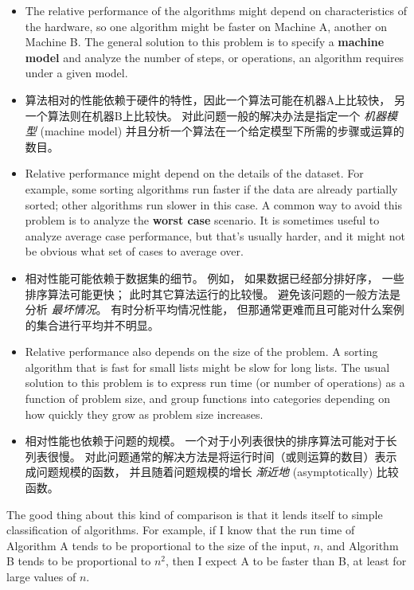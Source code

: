 \begin{itemize}

\item The relative performance of the algorithms might
depend on characteristics of the hardware, so one algorithm
might be faster on Machine A, another on Machine B.
The general solution to this problem is to specify a
{\bf machine model} and analyze the number of steps, or
operations, an algorithm requires under a given model.

\item 算法相对的性能依赖于硬件的特性，因此一个算法可能在机器A上比较快， 另一个算法则在机器B上比较快。
对此问题一般的解决办法是指定一个 {\em 机器模型} (machine model) 并且分析一个算法在一个给定模型下所需的步骤或运算的数目。
 

\item Relative performance might depend on the details of
the dataset.  For example, some sorting
algorithms run faster if the data are already partially sorted;
other algorithms run slower in this case.
A common way to avoid this problem is to analyze the
{\bf worst case} scenario.  It is sometimes useful to
analyze average case performance, but that's usually harder,
and it might not be obvious what set of cases to average over.
  

\item 相对性能可能依赖于数据集的细节。
例如， 如果数据已经部分排好序， 一些排序算法可能更快； 此时其它算法运行的比较慢。
避免该问题的一般方法是分析 {\em 最坏情况}。
有时分析平均情况性能， 但那通常更难而且可能对什么案例的集合进行平均并不明显。

\item Relative performance also depends on the size of the
problem.  A sorting algorithm that is fast for small lists
might be slow for long lists.
The usual solution to this problem is to express run time
(or number of operations) as a function of problem size,
and group functions into categories depending on how quickly
they grow as problem size increases.

\item    相对性能也依赖于问题的规模。
一个对于小列表很快的排序算法可能对于长列表很慢。
对此问题通常的解决方法是将运行时间（或则运算的数目）表示成问题规模的函数，    并且随着问题规模的增长 {\em 渐近地} (asymptotically) 比较函数。
\end{itemize}

The good thing about this kind of comparison is that it lends
itself to simple classification of algorithms.  For example,
if I know that the run time of Algorithm A tends to be
proportional to the size of the input, $n$, and Algorithm B
tends to be proportional to $n^2$, then I
expect A to be faster than B, at least for large values of $n$.

